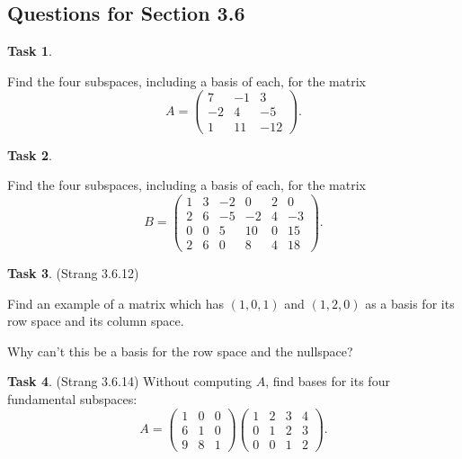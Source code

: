 \documentclass[10pt,]{book}
\theoremstyle{plain}
\theoremstyle{definition}
\numberwithin{equation}{section}
\newtheorem{task}{Task}[chapter]
\begin{document}
\subsection[Questions for Section 3.6]{Questions for Section 3.6}\label{subsection-89}
\begin{task}
\label{task-115}

        Find the four subspaces, including a basis of each, for the matrix
        \[
          A = \begin{pmatrix}
          7 & -1 & 3 \\
          -2 & 4 & -5 \\
          1 & 11 & -12
          \end{pmatrix}.
        \]\end{task}
\begin{task}
\label{task-116}

        Find the four subspaces, including a basis of each, for the matrix
        \[
          B = \begin{pmatrix}
          1 & 3 & -2 & 0 & 2 & 0 \\
          2 & 6 & -5 & -2 & 4 & -3 \\
          0 & 0 & 5 & 10 & 0 & 15 \\
          2 & 6 & 0 & 8 & 4 & 18
          \end{pmatrix}.
        \]\end{task}
\begin{task}
\label{task-117}
(Strang 3.6.12)
        
          Find an example of a matrix which has \((1,0,1)\) and \((1,2,0)\)
          as a basis for its row space and its column space.
\par

          Why can't this be a basis for the row space and the nullspace?
\end{task}
\begin{task}
\label{task-118}
(Strang 3.6.14)
        Without computing \(A\), find bases for its four fundamental subspaces:
        \[
          A = \begin{pmatrix} 1 & 0 & 0 \\
          6 & 1 & 0 \\ 9 & 8 & 1 \end{pmatrix}
          \begin{pmatrix} 1 & 2 & 3 & 4 \\
          0 & 1 & 2 & 3 \\ 0 & 0 & 1 & 2 \end{pmatrix}.
        \]\end{task}
\end{document}
